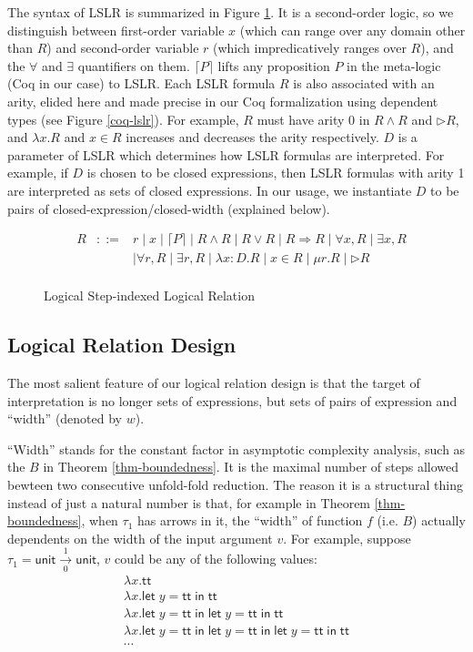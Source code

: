 \documentclass[preprint]{sigplanconf}
\newcommand{\arrow}[4]{#1\xrightarrow[#3]{#2}#4}
\newcommand{\symlet}{\mathsf{let\;}}
\newcommand{\symin}{\mathsf{\;in\;}}
\newcommand{\symtt}{\mathsf{tt}}
\newcommand{\symunit}{\mathsf{unit}}
\newcommand{\later}{\triangleright}
\begin{document}
The syntax of LSLR is summarized in Figure \ref{lslr}. It is a second-order logic, so we distinguish between first-order variable $x$ (which can range over any domain other than $R$) and second-order variable $r$ (which impredicatively ranges over $R$), and the $\forall$ and $\exists$ quantifiers on them. $\lceil P \rceil$ lifts any proposition $P$ in the meta-logic (Coq in our case) to LSLR. Each LSLR formula $R$ is also associated with an arity, elided here and made precise in our Coq formalization using dependent types (see Figure \ref{coq-lslr}). For example, $R$ must have arity 0 in $R \wedge R$ and $\later R$, and $\lambda x.R$ and $x\in R$ increases and decreases the arity respectively. $D$ is a parameter of LSLR which determines how LSLR formulas are interpreted. For example, if $D$ is chosen to be closed expressions, then LSLR formulas with arity 1 are interpreted as sets of closed expressions. In our usage, we instantiate $D$ to be pairs of closed-expression/closed-width (explained below).

\begin{figure}
  $$\begin{array}{rrcl}
    & R &::=& r \mid x \mid \lceil P \rceil \mid R \wedge R \mid R \vee R \mid R \Rightarrow R \mid \forall x,R \mid \exists x,R \\
    & & & \mid \forall r,R \mid \exists r,R \mid \lambda x:D.R \mid x\in R \mid \mu r. R \mid \later R \\
  \end{array}$$
  \caption{\label{lslr}Logical Step-indexed Logical Relation}
\end{figure}

\subsection {Logical Relation Design}

The most salient feature of our logical relation design is that the target of interpretation is no longer sets of expressions, but sets of pairs of expression and ``width'' (denoted by $w$).

``Width'' stands for the constant factor in asymptotic complexity analysis, such as the $B$ in Theorem \ref{thm-boundedness}. It is the maximal number of steps allowed bewteen two consecutive unfold-fold reduction. The reason it is a structural thing instead of just a natural number is that, for example in Theorem \ref{thm-boundedness}, when $\tau_1$ has arrows in it, the ``width'' of function $f$ (i.e. $B$) actually dependents on the width of the input argument $v$. For example, suppose $\tau_1=\arrow{\symunit}{1}{0}{\symunit}$, $v$ could be any of the following values:
$$
\begin{array}{l}
  \lambda x.\symtt \\
  \lambda x.\symlet y=\symtt\symin\symtt \\
  \lambda x.\symlet y=\symtt\symin\symlet y=\symtt\symin\symtt \\
  \lambda x.\symlet y=\symtt\symin\symlet y=\symtt\symin\symlet y=\symtt\symin\symtt \\
  \cdots
\end{array}
$$
\end{document}
